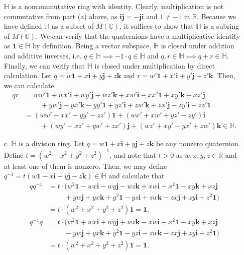 \documentclass[12pt]{article}
\begin{document}
\begin{enumerate}
{    $\mathbb H$ is a noncommutative ring with identity. Clearly, multiplication is not commutative from part (a) above, as $\mathbf{i}\mathbf{j} = -\mathbf{j}\mathbf{i}$ and $1 \neq -1$ in $\mathbb R$. Because we have defined $\mathbb H$ as a subset of $M(\mathbb C)$, it suffices to show that $\mathbb H$ is a subring of $M(\mathbb C)$. We can verify that the quaternions have a multiplicative identity as $\mathbf{1} \in \mathbb H$ by definition. Being a vector subspace, $\mathbb H$ is closed under addition and additive inverses, i.e. $q \in \mathbb H \implies -1 \cdot q \in \mathbb H$ and $q, r \in \mathbb H \implies q + r \in \mathbb H$. Finally, we can verify that $\mathbb H$ is closed under multiplication by direct calculation. Let $q = w \mathbf{1} + x \mathbf{i} + y \mathbf{j} + z \mathbf{k}$ and $r = w' \mathbf{1} + x' \mathbf{i} + y' \mathbf{j} + z' \mathbf{k}$. Then, we can calculate
    \begin{align*}
        qr &= ww' \mathbf{1} + wx' \mathbf{i} + w y' \mathbf{j} + w z' \mathbf{k} + xw' \mathbf{i} - x x' \mathbf{1} + x y' \mathbf{k} - x z' \mathbf{j} \\ &\qquad\; + yw' \mathbf{j} - yx' \mathbf{k} - y y' \mathbf{1} + y z' \mathbf{i} + z w' \mathbf{k} + z x' \mathbf{j} - z y' \mathbf{i} - z z' \mathbf{1} \\
        &= (ww' - xx' - yy' - zz') \mathbf{1} + (wx' + xw' + yz' - zy') \mathbf{i} \\ &\qquad\; + (wy' - xz' + yw' + zx')\mathbf{j} +  (wz' + xy' -yx' + zw') \mathbf{k} \in \mathbb H.
    \end{align*}
    
}
\item[c.] $\mathbb H$ is a division ring. Let $q = w \mathbf 1 + x \mathbf i + y \mathbf j + z \mathbf k$ be any nonzero quaternion. Define $t = (w^2 + x^2 + y^2 + z^2)^{-1}$, and note that $t > 0$ as $w,x,y,z \in \mathbb R$ and at least one of them is nonzero. Then, we may define $q^{-1} = t(w \mathbf 1 - x \mathbf i - y \mathbf j - z \mathbf k) \in \mathbb H$ and calculate that
\begin{align*}
    qq^{-1} &= t \cdot (w^2 \mathbf{1} - wx \mathbf{i} - wy \mathbf{j} - wz \mathbf{k} + xw \mathbf{i} + x^2 \mathbf{1} - xy \mathbf{k} + xz \mathbf{j} \\ &\qquad\; + yw \mathbf{j} + yx \mathbf{k} + y^2 \mathbf{1} - yz \mathbf{i} + zw \mathbf{k} -zx \mathbf{j} + zy\mathbf{i} + z^2 \mathbf{1}) \\ &= t \cdot (w^2 + x^2 + y^2 + z^2) \mathbf{1} = \mathbf{1}. \\
    q^{-1} q &= t \cdot (w^2 \mathbf{1} + wx \mathbf{i} + wy \mathbf{j} + wz \mathbf{k} - xw \mathbf{i} + x^2 \mathbf{1} - xy \mathbf{k} + xz \mathbf{j} \\ &\qquad\; - yw \mathbf{j} + yx \mathbf{k} + y^2 \mathbf{1} - yz\mathbf{i} - zw \mathbf{k} - zx \mathbf{j} + zy\mathbf{i} + z^2 \mathbf{1})
     \\ &= t \cdot (w^2 + x^2 + y^2 + z^2) \mathbf{1} = \mathbf{1}.
\end{align*}


\end{enumerate}
\end{document}
